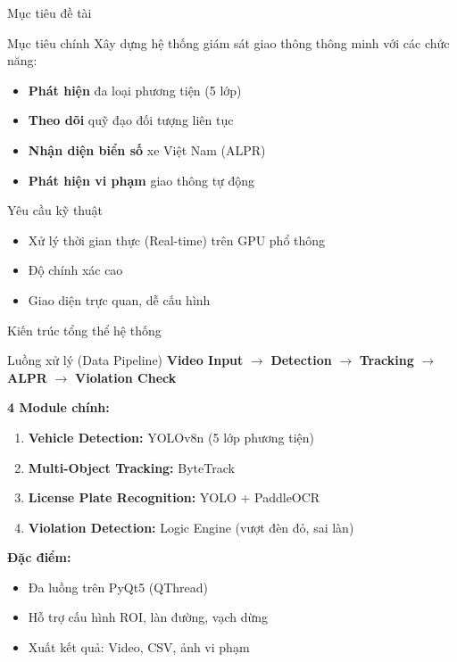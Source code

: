 \begin{frame}{Mục tiêu đề tài}
    \begin{block}{Mục tiêu chính}
    Xây dựng hệ thống giám sát giao thông thông minh với các chức năng:
    \begin{itemize}
        \item \textbf{Phát hiện} đa loại phương tiện (5 lớp)
        \item \textbf{Theo dõi} quỹ đạo đối tượng liên tục
        \item \textbf{Nhận diện biển số} xe Việt Nam (ALPR)
        \item \textbf{Phát hiện vi phạm} giao thông tự động
    \end{itemize}
    \end{block}

    \begin{block}{Yêu cầu kỹ thuật}
    \begin{itemize}
        \item Xử lý thời gian thực (Real-time) trên GPU phổ thông
        \item Độ chính xác cao
        \item Giao diện trực quan, dễ cấu hình
    \end{itemize}
    \end{block}
\end{frame}

\begin{frame}{Kiến trúc tổng thể hệ thống}
    \begin{block}{Luồng xử lý (Data Pipeline)}
    \centering
    \textbf{Video Input} $\rightarrow$ \textbf{Detection} $\rightarrow$ \textbf{Tracking} $\rightarrow$ \textbf{ALPR} $\rightarrow$ \textbf{Violation Check}
    \end{block}

    \vspace{0.5em}
    \textbf{4 Module chính:}
    \begin{enumerate}
        \item \textbf{Vehicle Detection:} YOLOv8n (5 lớp phương tiện)
        \item \textbf{Multi-Object Tracking:} ByteTrack
        \item \textbf{License Plate Recognition:} YOLO + PaddleOCR
        \item \textbf{Violation Detection:} Logic Engine (vượt đèn đỏ, sai làn)
    \end{enumerate}

    \vspace{0.5em}
    \textbf{Đặc điểm:}
    \begin{itemize}
        \item Đa luồng trên PyQt5 (QThread)
        \item Hỗ trợ cấu hình ROI, làn đường, vạch dừng
        \item Xuất kết quả: Video, CSV, ảnh vi phạm
    \end{itemize}
\end{frame}

